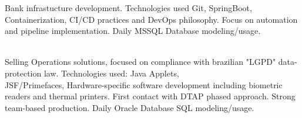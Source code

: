 \documentclass[10pt,a4paper,ragged2e]{altacv}
\begin{document}

\begin{fullwidth}
\makecvheader
\end{fullwidth}



Bank infrastucture development. Technologies used Git, SpringBoot, Containerization, CI/CD practices and DevOps philosophy. Focus on automation and pipeline implementation. Daily MSSQL Database modeling/usage.
\\

 \\

\divider

Selling Operations solutions, focused on compliance with brazilian "LGPD" data-protection law. Technologies used: Java Applets,\\ JSF/Primefaces, Hardware-specific software development including biometric readers and thermal printers. First contact with DTAP phased approach. Strong team-based production. Daily Oracle Database SQL modeling/usage.
\\
\end{document}
